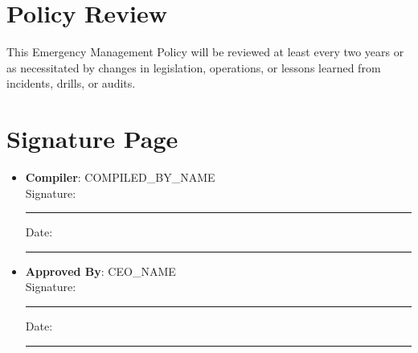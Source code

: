 \documentclass[11pt]{article}
\newcommand{\compilerName}{{{COMPILED_BY_NAME}}}
\begin{document}
\section{Policy Review}
This Emergency Management Policy will be reviewed at least every two years or as necessitated by changes in legislation, operations, or lessons learned from incidents, drills, or audits.

\section{Signature Page}
\begin{itemize}
  \item \textbf{Compiler}: \compilerName \\
    Signature: \rule{5cm}{0.4pt} \quad Date: \rule{3cm}{0.4pt}
  \item \textbf{Approved By}: {{CEO_NAME}} \\
    Signature: \rule{5cm}{0.4pt} \quad Date: \rule{3cm}{0.4pt}
\end{itemize}
\end{document}
